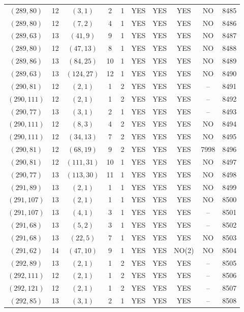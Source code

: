 \begin{longtable}{|c|c|c|c|c|c|c|c|c|c|}
$(289, 80)$ & 12 & $(3, 1)$ & 2 & 1 & YES & YES & YES & NO & 8485\\
$(289, 80)$ & 12 & $(7, 2)$ & 4 & 1 & YES & YES & YES & NO & 8486\\
$(289, 63)$ & 13 & $(41, 9)$ & 9 & 1 & YES & YES & YES & NO & 8487\\
$(289, 80)$ & 12 & $(47, 13)$ & 8 & 1 & YES & YES & YES & NO & 8488\\
$(289, 86)$ & 13 & $(84, 25)$ & 10 & 1 & YES & YES & YES & NO & 8489\\
$(289, 63)$ & 13 & $(124, 27)$ & 12 & 1 & YES & YES & YES & NO & 8490\\
$(290, 81)$ & 12 & $(2, 1)$ & 1 & 2 & YES & YES & YES & -- & 8491\\
$(290, 111)$ & 12 & $(2, 1)$ & 1 & 2 & YES & YES & YES & -- & 8492\\
$(290, 77)$ & 13 & $(3, 1)$ & 2 & 1 & YES & YES & YES & -- & 8493\\
$(290, 111)$ & 12 & $(8, 3)$ & 4 & 2 & YES & YES & YES & NO & 8494\\
$(290, 111)$ & 12 & $(34, 13)$ & 7 & 2 & YES & YES & YES & NO & 8495\\
$(290, 81)$ & 12 & $(68, 19)$ & 9 & 2 & YES & YES & YES & 7998 & 8496\\
$(290, 81)$ & 12 & $(111, 31)$ & 10 & 1 & YES & YES & YES & NO & 8497\\
$(290, 77)$ & 13 & $(113, 30)$ & 11 & 1 & YES & YES & YES & NO & 8498\\
$(291, 89)$ & 13 & $(2, 1)$ & 1 & 1 & YES & YES & YES & NO & 8499\\
$(291, 107)$ & 13 & $(2, 1)$ & 1 & 1 & YES & YES & YES & NO & 8500\\
$(291, 107)$ & 13 & $(4, 1)$ & 3 & 1 & YES & YES & YES & -- & 8501\\
$(291, 68)$ & 13 & $(5, 2)$ & 3 & 1 & YES & YES & YES & -- & 8502\\
$(291, 68)$ & 13 & $(22, 5)$ & 7 & 1 & YES & YES & YES & NO & 8503\\
$(291, 62)$ & 14 & $(47, 10)$ & 9 & 1 & YES & YES & NO(2) & NO & 8504\\
$(292, 89)$ & 13 & $(2, 1)$ & 1 & 2 & YES & YES & YES & -- & 8505\\
$(292, 111)$ & 12 & $(2, 1)$ & 1 & 2 & YES & YES & YES & -- & 8506\\
$(292, 121)$ & 12 & $(2, 1)$ & 1 & 2 & YES & YES & YES & -- & 8507\\
$(292, 85)$ & 13 & $(3, 1)$ & 2 & 1 & YES & YES & YES & -- & 8508\\

\end{longtable}
